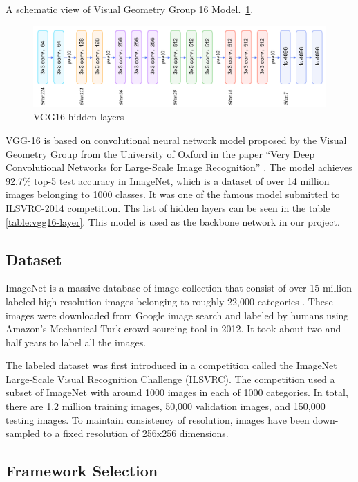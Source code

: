 A schematic view of Visual Geometry Group 16 Model.~\ref{fig:CNN-2}.
\begin{figure}[htbp]
\centering
\includegraphics[width=1\textwidth]{images/cnn-vgg16-1.png}
\caption{VGG16 hidden layers}
\label{fig:CNN-2}
\end{figure}

VGG-16 is based on convolutional neural network model proposed by the Visual Geometry Group from the University of Oxford in the paper “Very Deep Convolutional Networks for Large-Scale Image Recognition” \cite{2014arXiv1409.1556S}. The model achieves 92.7\% top-5 test accuracy in ImageNet, which is a dataset of over 14 million images belonging to 1000 classes. It was one of the famous model submitted to ILSVRC-2014 competition. Ths list of hidden layers can be seen in the table \ref{table:vgg16-layer}. This model is used as the backbone network in our project.

\subsection{Dataset}

ImageNet is a massive database of image collection that consist of over 15 million labeled high-resolution images belonging to roughly 22,000 categories \cite{edsarx.1409.057520140101}. These images were downloaded from Google image search and labeled by humans using Amazon's Mechanical Turk crowd-sourcing tool in 2012. It took about two and half years to label all the images. 

The labeled dataset was first introduced in a competition called the ImageNet Large-Scale Visual Recognition Challenge (ILSVRC). The competition used a subset of ImageNet with around 1000 images in each of 1000 categories. In total, there are 1.2 million training images, 50,000 validation images, and 150,000 testing images. To maintain consistency of resolution, images have been down-sampled to a fixed resolution of 256x256 dimensions.
    
\subsection{Framework Selection}

